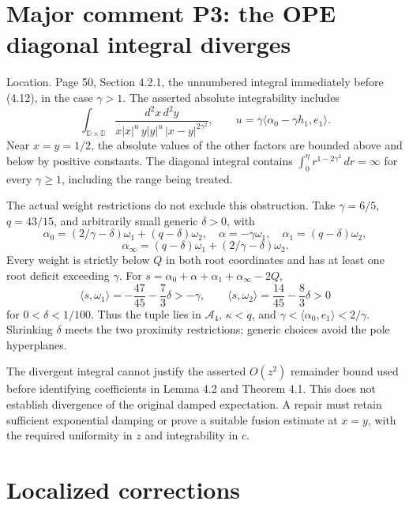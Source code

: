 \documentclass[10pt]{article}
\begin{document}
\section*{Major comment P3: the OPE diagonal integral diverges}
Location. Page 50, Section 4.2.1, the unnumbered integral immediately before (4.12), in the case \(\gamma>1\). The asserted absolute integrability includes \[\int_{\mathbb D\times\mathbb D}
 \frac{d^2x\,d^2y}
 {x|x|^u\,y|y|^u\,|x-y|^{2\gamma^2}},
 \qquad u=\gamma\langle\alpha_0-\gamma h_1,e_1\rangle.\] Near \(x=y=1/2\), the absolute values of the other factors are bounded above and below by positive constants. The diagonal integral contains \(\int_0^\eta r^{1-2\gamma^2}\,dr=\infty\) for every \(\gamma\geq1\), including the range being treated.\par
The actual weight restrictions do not exclude this obstruction. Take \(\gamma=6/5\), \(q=43/15\), and arbitrarily small generic \(\delta>0\), with \[\alpha_0=(2/\gamma-\delta)\omega_1+(q-\delta)\omega_2,\quad
 \alpha=-\gamma\omega_1,\quad\alpha_1=(q-\delta)\omega_2,\] \[\alpha_\infty=(q-\delta)\omega_1+(2/\gamma-\delta)\omega_2.\] Every weight is strictly below \(Q\) in both root coordinates and has at least one root deficit exceeding \(\gamma\). For \(s=\alpha_0+\alpha+\alpha_1+\alpha_\infty-2Q\), \[\langle s,\omega_1\rangle=-\frac{47}{45}-\frac73\delta>-\gamma,
 \qquad
 \langle s,\omega_2\rangle=\frac{14}{45}-\frac83\delta>0\] for \(0<\delta<1/100\). Thus the tuple lies in \(\mathcal A_4\), \(\kappa<q\), and \(\gamma<\langle\alpha_0,e_1\rangle<2/\gamma\). Shrinking \(\delta\) meets the two proximity restrictions; generic choices avoid the pole hyperplanes.\par
The divergent integral cannot justify the asserted \(O(z^2)\) remainder bound used before identifying coefficients in Lemma 4.2 and Theorem 4.1. This does not establish divergence of the original damped expectation. A repair must retain sufficient exponential damping or prove a suitable fusion estimate at \(x=y\), with the required uniformity in \(z\) and integrability in \(c\).\par
\section*{Localized corrections}
\end{document}
